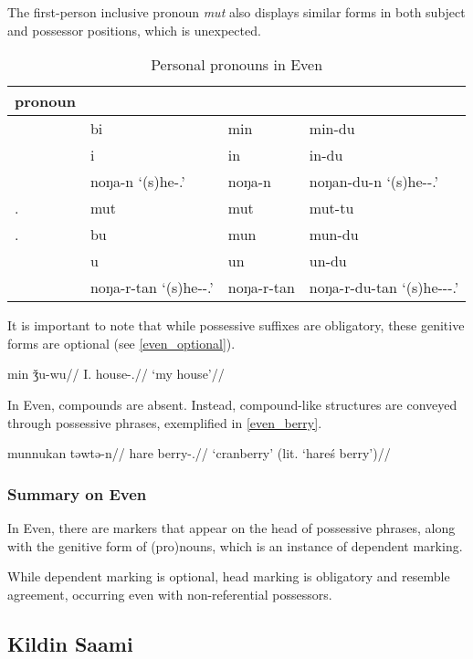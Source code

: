 The first-person inclusive pronoun \textit{mut} also displays similar forms in both subject and possessor positions, which is unexpected.

\begin{table}[t]
	\centering
	\begin{tabular}[t]{llll}\addlinespace\toprule
		pronoun    & \Nom & \Gen & \Dat  \\\midrule
		\Fsg     & bi & min &  min-du  \\
		\Ssg     & i & in & in-du    \\
		\Tsg     & noŋa-n `(s)he-\Poss.\Tsg' & noŋa-n & noŋan-du-n `(s)he-\Dat-\Poss.\Tsg' \\
		\Fpl.\Incl & mut & mut & mut-tu \\
		\Fpl.\Excl & bu & mun & mun-du \\
		\Spl     & u & un & un-du     \\
		\Tpl     & noŋa-r-tan `(s)he-\Pl-\Poss.\Tpl' & noŋa-r-tan  & noŋa-r-du-tan `(s)he-\Pl-\Dat-\Poss.\Tpl'\\\bottomrule
	\end{tabular}
	\caption{\centering Personal pronouns in Even}
	\label{even_pronouns}
\end{table}

It is important to note that while possessive suffixes are obligatory, these genitive forms are optional (see \ref{even_optional}).

\ex
\label{even_optional}
\begingl
\gla min ǯu-wu//
\glb I.\Obl{} house-\Poss{}.\Fsg//
\glft `my house'//
\endgl
\xe 

In Even, compounds are absent. Instead, compound-like structures are conveyed through possessive phrases, exemplified in \ref{even_berry}.

\ex
\begingl
\gla munnukan təwtə-n//
\glb hare berry-\Poss.\Tsg//
\glft `cranberry' (lit. `hare\'s berry')//
\endgl
\xe

\subsubsection*{Summary on Even}

In Even, there are markers that appear on the head of possessive phrases, along with the genitive form of (pro)nouns, which is an instance of dependent marking.

While dependent marking is optional, head marking is obligatory and resemble agreement, occurring even with non-referential possessors.

\subsection{Kildin Saami}

